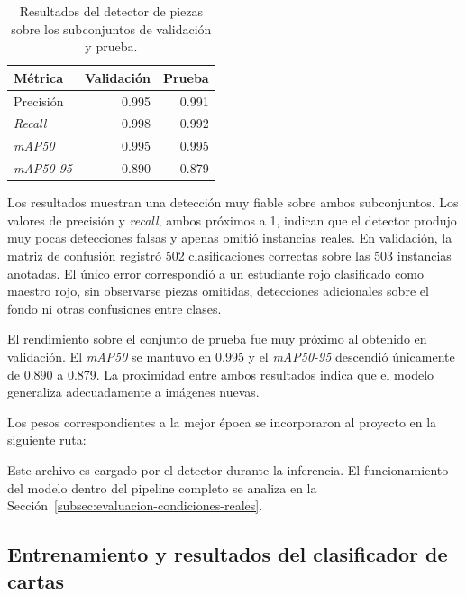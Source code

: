 \begin{table}[H]
\centering
\small
\begin{tabular}{l r r}
\hline
\textbf{Métrica} & \textbf{Validación} & \textbf{Prueba} \\
\hline
Precisión & 0.995 & 0.991 \\
\textit{Recall} & 0.998 & 0.992 \\
\textit{mAP50} & 0.995 & 0.995 \\
\textit{mAP50-95} & 0.890 & 0.879 \\
\hline
\end{tabular}
\caption{Resultados del detector de piezas sobre los subconjuntos de validación y prueba.}
\label{tab:metricas-detector-piezas}
\end{table}

Los resultados muestran una detección muy fiable sobre ambos subconjuntos. Los valores de precisión y \textit{recall}, ambos próximos a 1, indican que el detector produjo muy pocas detecciones falsas y apenas omitió instancias reales. En validación, la matriz de confusión registró 502 clasificaciones correctas sobre las 503 instancias anotadas. El único error correspondió a un estudiante rojo clasificado como maestro rojo, sin observarse piezas omitidas, detecciones adicionales sobre el fondo ni otras confusiones entre clases.

El rendimiento sobre el conjunto de prueba fue muy próximo al obtenido en validación. El \textit{mAP50} se mantuvo en 0.995 y el \textit{mAP50-95} descendió únicamente de 0.890 a 0.879. La proximidad entre ambos resultados indica que el modelo generaliza adecuadamente a imágenes nuevas.

Los pesos correspondientes a la mejor época se incorporaron al proyecto en la siguiente ruta:

\begin{center}
\small
{}
\end{center}

Este archivo es cargado por el detector durante la inferencia. El funcionamiento del modelo dentro del pipeline completo se analiza en la Sección~\ref{subsec:evaluacion-condiciones-reales}.


\subsection{Entrenamiento y resultados del clasificador de cartas}
\label{subsec:entrenamiento-clasificador-cartas}

